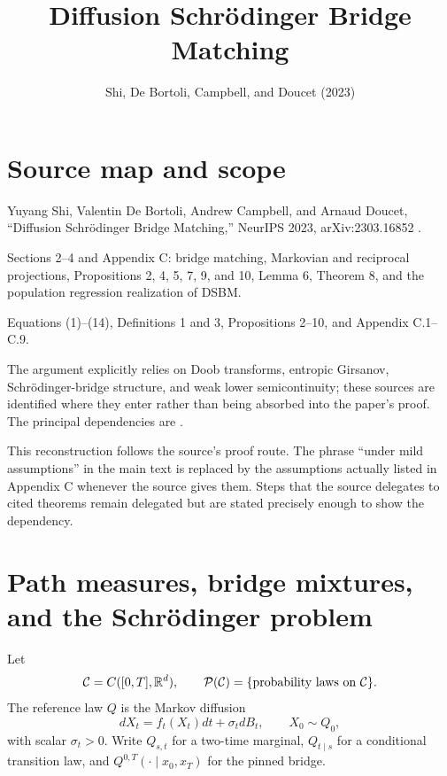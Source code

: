 
\title{Diffusion Schr\"odinger Bridge Matching}
\author{}
\date{Shi, De Bortoli, Campbell, and Doucet (2023)}

\maketitle

\section*{Source map and scope}
\begin{sourceguide}
\item[Primary source] Yuyang Shi, Valentin De Bortoli, Andrew Campbell, and Arnaud Doucet, ``Diffusion Schr\"odinger Bridge Matching,'' NeurIPS 2023, arXiv:2303.16852 \cite{ShiDeBortoliCampbellDoucet2023}.
\item[Coverage] Sections 2--4 and Appendix C: bridge matching, Markovian and reciprocal projections, Propositions 2, 4, 5, 7, 9, and 10, Lemma 6, Theorem 8, and the population regression realization of DSBM.
\item[Source order] Equations (1)--(14), Definitions 1 and 3, Propositions 2--10, and Appendix C.1--C.9.
\item[Supplemental references] The argument explicitly relies on Doob transforms, entropic Girsanov, Schr\"odinger-bridge structure, and weak lower semicontinuity; these sources are identified where they enter rather than being absorbed into the paper's proof.  The principal dependencies are \cite{PalmowskiRolski2002,Leonard2012Girsanov,Leonard2014Survey,LeonardRoellyZambrini2014,vanErvenHarremoes2014}.
\end{sourceguide}

This reconstruction follows the source's proof route.  The phrase ``under mild assumptions'' in the main text is replaced by the assumptions actually listed in Appendix C whenever the source gives them.  Steps that the source delegates to cited theorems remain delegated but are stated precisely enough to show the dependency.

\section{Path measures, bridge mixtures, and the Schr\"odinger problem}
Let
\[
 \mathcal C=C([0,T],\mathbb{R}^d),
 \qquad
 \mathcal{P}(\mathcal C)=\{\text{probability laws on }\mathcal C\}.
\]
The reference law \(Q\) is the Markov diffusion
\begin{equation}
 dX_t=f_t(X_t)dt+\sigma_t dB_t,
 \qquad X_0\sim Q_0,
 \tag{1}\label{eq:DSBM-Q}
\end{equation}
with scalar \(\sigma_t>0\).  Write \(Q_{s,t}\) for a two-time marginal, \(Q_{t\mid s}\) for a conditional transition law, and \(Q^{0,T}(\cdot\mid x_0,x_T)\) for the pinned bridge.

